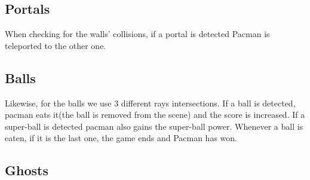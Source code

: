 \documentclass[a4paper,oneside]{report}
\begin{document}
\subsection{Portals}
When checking for the walls' collisions, if a portal is detected Pacman is teleported to the other one.
\subsection{Balls}
Likewise, for the balls we use 3 different rays intersections. If a ball is detected, pacman eats it(the ball is removed from the scene) and the score is increased. If a super-ball is detected pacman also gains the super-ball power. Whenever a ball is eaten, if it is the last one, the game ends and Pacman has won.
\subsection{Ghosts}
\end{document}

